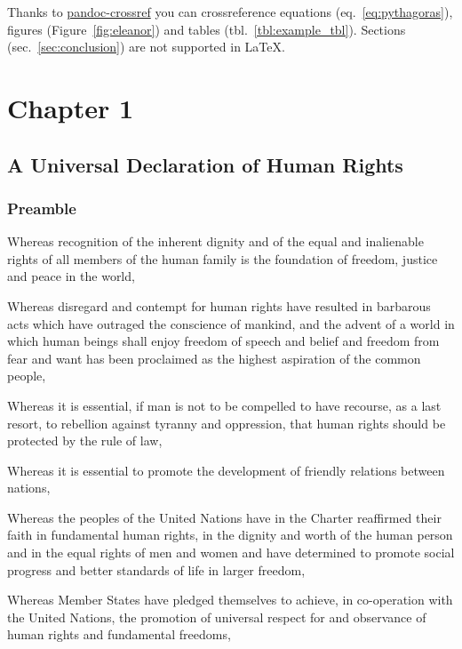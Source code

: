 \documentclass[
  titlepage,
  openright,
  DIV=calc,
  toc=listof,
  listof=nochaptergap]{scrbook}
\begin{document}
Thanks to
\href{https://lierdakil.github.io/pandoc-crossref/}{pandoc-crossref} you
can crossreference equations (eq.~\ref{eq:pythagoras}), figures
(Figure~\ref{fig:eleanor}) and tables (tbl.~\ref{tbl:example_tbl}).
Sections (sec.~\ref{sec:conclusion}) are not supported in LaTeX.

\chapter{Chapter 1}\label{sec:chapter1}

\section{A Universal Declaration of Human
Rights}\label{a-universal-declaration-of-human-rights}

\subsection{Preamble}\label{preamble}

Whereas recognition of the inherent dignity and of the equal and
inalienable rights of all members of the human family is the foundation
of freedom, justice and peace in the world,

Whereas disregard and contempt for human rights have resulted in
barbarous acts which have outraged the conscience of mankind, and the
advent of a world in which human beings shall enjoy freedom of speech
and belief and freedom from fear and want has been proclaimed as the
highest aspiration of the common people,

Whereas it is essential, if man is not to be compelled to have recourse,
as a last resort, to rebellion against tyranny and oppression, that
human rights should be protected by the rule of law,

Whereas it is essential to promote the development of friendly relations
between nations,

Whereas the peoples of the United Nations have in the Charter reaffirmed
their faith in fundamental human rights, in the dignity and worth of the
human person and in the equal rights of men and women and have
determined to promote social progress and better standards of life in
larger freedom,

Whereas Member States have pledged themselves to achieve, in
co-operation with the United Nations, the promotion of universal respect
for and observance of human rights and fundamental freedoms,
\end{document}
